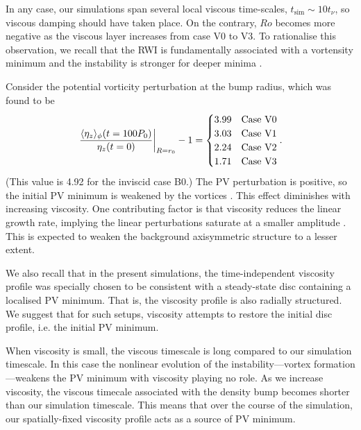 
In any case, our simulations span several local viscous time-scales,
$t_\mathrm{sim}\sim 10t_\nu $, so viscous damping should
have taken place. On the contrary, $Ro$ becomes more negative as the
viscous layer increases from case V0 to V3. To rationalise this
observation, we recall that the RWI is fundamentally
associated with a vortensity minimum and the instability is stronger
for deeper minima \citep{li00}.  

Consider the potential vorticity perturbation at the bump radius, which was
found to be  
\begin{align}\label{vortensity_pert}
  \left.\frac{\langle \eta_z \rangle_\phi(t=100P_0)}{\eta_z(t=0)}\right|_{R=r_0} - 1 = 
  \begin{cases}
    3.99  & \text{Case V0} \\
   3.03  & \text{Case V1} \\
   2.24  & \text{Case V2} \\
   1.71  & \text{Case V3} \\
  \end{cases}.
\end{align} 
(This value is 4.92 for the inviscid case B0.) The PV
perturbation is positive, so the initial PV minimum is weakened
by the vortices \citep{meheut10}. This effect
diminishes with increasing viscosity. One contributing factor is 
that viscosity reduces the linear growth rate, implying the linear
perturbations saturate at a smaller amplitude \citep{meheut13}. This
is expected to weaken the background axisymmetric structure to a lesser
extent.    

We also recall that in the present simulations, the time-independent
viscosity profile was specially chosen to be consistent with a
steady-state disc containing a localised PV minimum.  
That is, the viscosity profile is also radially structured. We suggest
that for such setups, viscosity attempts to restore the initial disc
profile, i.e. the initial PV minimum.   

When viscosity is small, the viscous timescale is long compared to our
simulation timescale. In this case the nonlinear evolution of the
instability---vortex formation---weakens the PV minimum with viscosity
playing no role. As we increase viscosity, the viscous timecale
associated with the density bump becomes shorter than our simulation
timescale. %
This means that over the course of the simulation, our spatially-fixed
viscosity profile acts as a source of PV minimum. 

